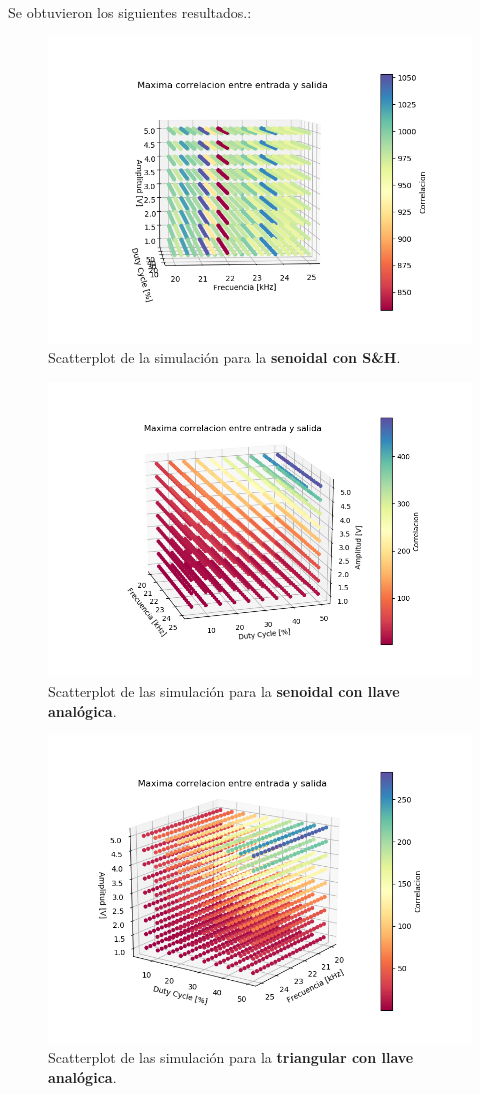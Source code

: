 Se obtuvieron los siguientes resultados.:
\begin{figure}[H]
\centering
	\includegraphics[width=0.8\linewidth]{ImagenesEjercicio6/scatter_sh_seno.png}
	\caption{Scatterplot de la simulación para la \textbf{senoidal con S\&H}.}
	\label{seno_sh}
\end{figure}

\begin{figure}[H]
\centering
	\includegraphics[width=0.8\linewidth]{ImagenesEjercicio6/scatter_llave_seno.png}
	\caption{Scatterplot de las simulación para la \textbf{senoidal con llave analógica}.}
	\label{seno_llave}
\end{figure}

\begin{figure}[H]
\centering
	\includegraphics[width=0.8\linewidth]{ImagenesEjercicio6/scatter_llave_triang.png}
	\caption{Scatterplot de las simulación para la \textbf{triangular con llave analógica}.}
	\label{triang_llave}
\end{figure}

